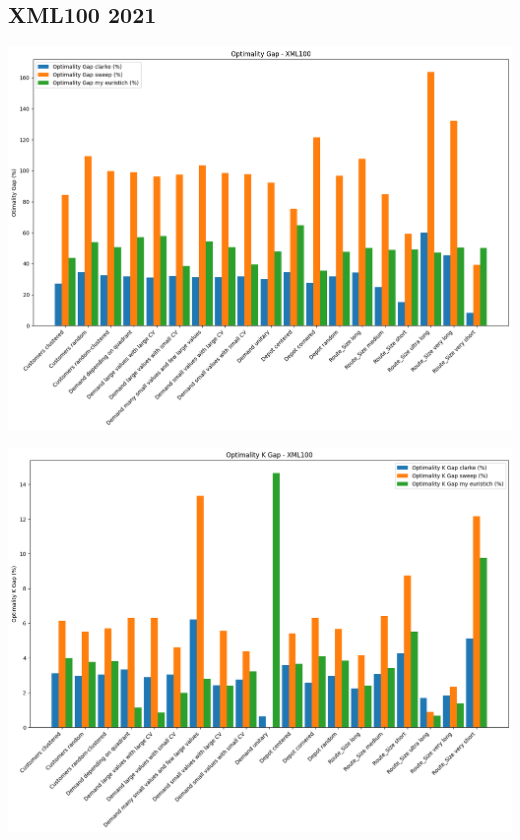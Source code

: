 \documentclass[compress]{beamer}
\begin{document}
\subsection{XML100 2021}
\begin{frame}{\subsecname}
    \begin{center}
		\begin{minipage}{1\textwidth}
            \centering
            \includegraphics[width=0.8\linewidth]{images/xml100_gap.png}
        \end{minipage}
    \end{center}
\end{frame}

\begin{frame}{\subsecname}
    \begin{center}
		\begin{minipage}{1\textwidth}
            \centering
            \includegraphics[width=0.8\linewidth]{images/xml100_kgap.png}
        \end{minipage}
    \end{center}
\end{frame}
\end{document}
